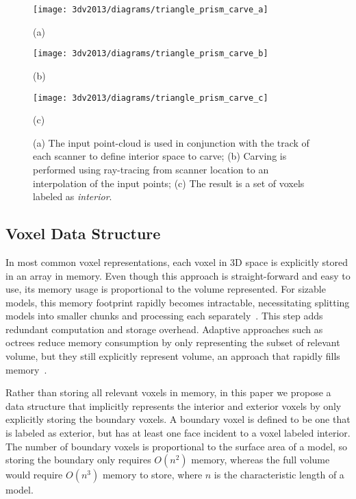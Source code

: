 \documentclass[12pt,onecolumn,oneside]{book}
\begin{document}
\begin{figure}

  \begin{minipage}[b]{0.3\linewidth}
  \centerline{\texttt{[image: 3dv2013/diagrams/triangle\_prism\_carve\_a]}}
  \centerline{(a)}\medskip
  \end{minipage}
  \begin{minipage}[b]{0.3\linewidth}
  \centerline{\texttt{[image: 3dv2013/diagrams/triangle\_prism\_carve\_b]}}
  \centerline{(b)}\medskip
  \end{minipage}
  \begin{minipage}[b]{0.3\linewidth}
  \centerline{\texttt{[image: 3dv2013/diagrams/triangle\_prism\_carve\_c]}}
  \centerline{(c)}\medskip
  \end{minipage}

\caption[Method of interpolating scans to carve voxels.]{(a) The input point-cloud is used in conjunction with the track of each scanner to define interior space to carve; (b) Carving is performed using ray-tracing from scanner location to an interpolation of the input points; (c) The result is a set of voxels labeled as {\it interior}.}
\label{fig:voxel_carving}
\end{figure}

\subsection{Voxel Data Structure}
\label{ssec:voxel_carving_data_structure}

In most common voxel representations, each voxel in 3D space is explicitly stored in an array in memory.  Even though this approach is straight-forward and easy to use, its memory usage is proportional to the volume represented.  For sizable models, this memory footprint rapidly becomes intractable, necessitating splitting models into smaller chunks and processing each separately~\cite{Carving}.  This step adds redundant computation and storage overhead.  Adaptive approaches such as octrees reduce memory consumption by only representing the subset of relevant volume, but they still explicitly represent volume, an approach that rapidly fills memory~\cite{OctreeSculpting,Yang05}.

Rather than storing all relevant voxels in memory, in this paper we propose a data structure that implicitly represents the interior and exterior voxels by only explicitly storing the boundary voxels.  A boundary voxel is defined to be one that is labeled as exterior, but has at least one face incident to a voxel labeled interior.  The number of boundary voxels is proportional to the surface area of a model, so storing the boundary only requires $O(n^2)$ memory, whereas the full volume would require $O(n^3)$ memory to store, where $n$ is the characteristic length of a model.
\end{document}
